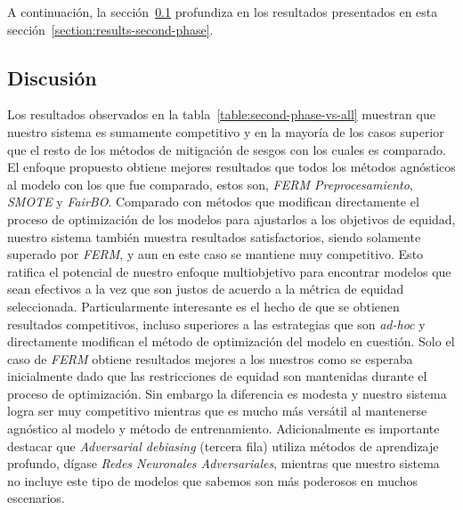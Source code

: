 A continuación, la sección~\ref{section:discussion-second-phase} profundiza en los resultados presentados en esta sección~\ref{section:results-second-phase}.

\subsection{Discusión}\label{section:discussion-second-phase}

Los resultados observados en la tabla~\ref{table:second-phase-vs-all} muestran que nuestro sistema es sumamente competitivo y en la mayoría de los casos superior que el resto de los métodos de mitigación de sesgos con los cuales es comparado.
El enfoque propuesto obtiene mejores resultados que todos los métodos agnósticos al modelo con los que fue comparado, estos son, \emph{FERM Preprocesamiento}, \emph{SMOTE} y \emph{FairBO}.
Comparado con métodos que modifican directamente el proceso de optimización de los modelos para ajustarlos a los objetivos de equidad, nuestro sistema también muestra resultados satisfactorios, siendo solamente superado por \emph{FERM}, y aun en este caso se mantiene muy competitivo.
Esto ratifica el potencial de nuestro enfoque multiobjetivo para encontrar modelos que sean efectivos a la vez que son justos de acuerdo a la métrica de equidad seleccionada.
Particularmente interesante es el hecho de que se obtienen resultados competitivos, incluso superiores a las estrategias que son \emph{ad-hoc} y directamente modifican el método de optimización del modelo en cuestión.
Solo el caso de \emph{FERM} obtiene resultados mejores a los nuestros como se esperaba inicialmente dado que las restricciones de equidad son mantenidas durante el proceso de optimización.
Sin embargo la diferencia es modesta y nuestro sistema logra ser muy competitivo mientras que es mucho más versátil al mantenerse agnóstico al modelo y método de entrenamiento.
Adicionalmente es importante destacar que \emph{Adversarial debiasing} (tercera fila) utiliza métodos de aprendizaje profundo, dígase \emph{Redes Neuronales Adversariales}, mientras que nuestro sistema no incluye este tipo de modelos que sabemos son más poderosos en muchos escenarios.

